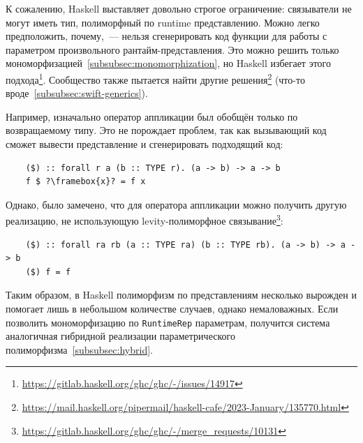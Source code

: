 К сожалению, Haskell выставляет довольно строгое ограничение: связыватели не могут иметь тип, полиморфный по runtime представлению.
Можно легко предположить, почему,~--- нельзя сгенерировать код функции для работы с параметром произвольного рантайм-представления.
Это можно решить только мономорфизацией~\ref{subsubsec:monomorphization}, но Haskell избегает этого подхода\footnote{\url{https://gitlab.haskell.org/ghc/ghc/-/issues/14917}}.
Сообщество также пытается найти другие решения\footnote{\url{https://mail.haskell.org/pipermail/haskell-cafe/2023-January/135770.html}} (что-то вроде~\ref{subsubsec:swift-generics}).

Например, изначально оператор аппликации был обобщён только по возвращаемому типу.
Это не порождает проблем, так как вызывающий код сможет вывести представление и сгенерировать подходящий код:
\begin{verbatim}
    ($) :: forall r a (b :: TYPE r). (a -> b) -> a -> b
    f $ ?\framebox{x}? = f x
\end{verbatim}

Однако, было замечено, что для оператора аппликации можно получить другую реализацию, не использующую levity-полиморфное связывание\footnote{\url{https://gitlab.haskell.org/ghc/ghc/-/merge_requests/10131}}:
\begin{verbatim}
    ($) :: forall ra rb (a :: TYPE ra) (b :: TYPE rb). (a -> b) -> a -> b
    ($) f = f
\end{verbatim}

Таким образом, в Haskell полиморфизм по представлениям несколько вырожден и помогает лишь в небольшом количестве случаев, однако немаловажных.
Если позволить мономорфизацию по \texttt{RuntimeRep} параметрам, получится система аналогичная гибридной реализации параметрического полиморфизма~\ref{subsubsec:hybrid}.
